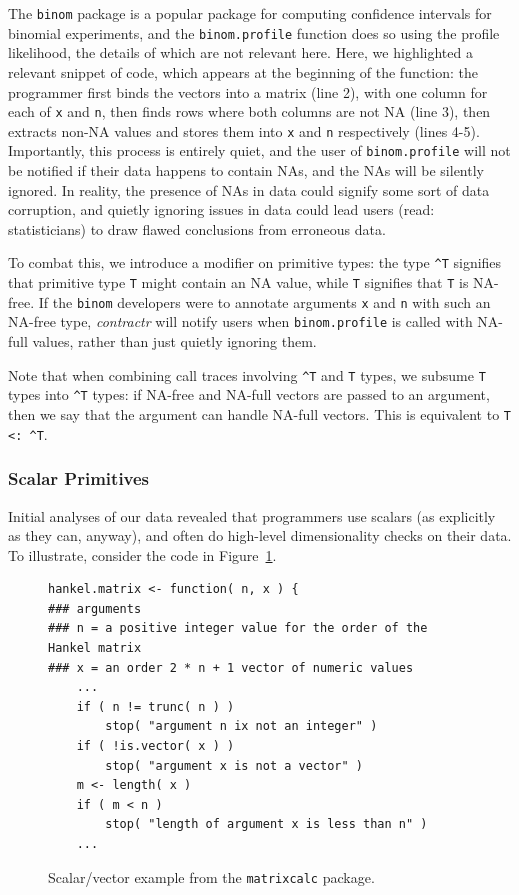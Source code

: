 \documentclass[acmsmall,review,anonymous]{acmart}\settopmatter{printfolios=true,printccs=false,printacmref=false}
\newcommand{\code}[1]{{\lstinline[style=Rin]!#1!}\xspace}
\newcommand{\contractr}{\emph{contractr}\xspace} %
\begin{document}
The \code{binom} package is a popular package  for computing confidence intervals for binomial experiments, and the \code{binom.profile} function does so using the profile likelihood, the details of which are not relevant here.
Here, we highlighted a relevant snippet of code, which appears at the beginning of the function: the programmer first binds the vectors into a matrix (line 2), with one column for each of \code{x} and \code{n}, then finds rows where both columns are not NA (line 3), then extracts non-NA values and stores them into \code{x} and \code{n} respectively (lines 4-5).
Importantly, this process is entirely quiet, and the user of \code{binom.profile} will not be notified if their data happens to contain NAs, and the NAs will be silently ignored. 
In reality, the presence of NAs in data could signify some sort of data corruption, and quietly ignoring issues in data could lead users (read: statisticians) to draw flawed conclusions from erroneous data.

To combat this, we introduce a modifier on primitive types: the type \code{^T} signifies that primitive type \code{T} might contain an NA value, while \code{T} signifies that \code{T} is NA-free. 
If the \code{binom} developers were to annotate arguments \code{x} and \code{n} with such an NA-free type, \contractr will notify users when \code{binom.profile} is called with NA-full values, rather than just quietly ignoring them.

Note that when combining call traces involving \code{^T} and \code{T} types, we subsume \code{T} types into \code{^T} types: if NA-free and NA-full vectors are passed to an argument, then we say that the argument can handle NA-full vectors.
This is equivalent to \code{T <: ^T}. 

%
%
\subsubsection{Scalar Primitives}

Initial analyses of our data revealed that programmers  use scalars (as explicitly as they can, anyway), and often do high-level dimensionality checks on their data.
To illustrate, consider the code in Figure~\ref{fig:scalar-vector-example}.

\begin{figure}[htbp]
\begin{center}

\begin{lstlisting}
hankel.matrix <- function( n, x ) { 
### arguments
### n = a positive integer value for the order of the Hankel matrix
### x = an order 2 * n + 1 vector of numeric values
    ...
    if ( n != trunc( n ) )
        stop( "argument n ix not an integer" )
    if ( !is.vector( x ) )
        stop( "argument x is not a vector" )
    m <- length( x )
    if ( m < n )
        stop( "length of argument x is less than n" )
    ...
\end{lstlisting}

\caption{Scalar/vector example from the \code{matrixcalc} package.}
\label{fig:scalar-vector-example}
\end{center}
\end{figure}
\end{document}
